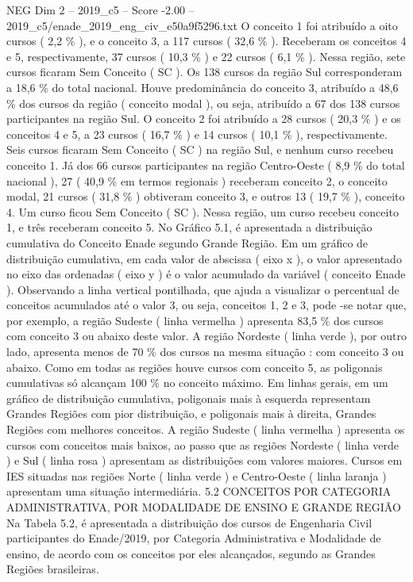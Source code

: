 \begin{textsample}{NEG Dim 2 – 2019\_c5 – Score -2.00 – 2019\_c5/enade\_2019\_eng\_civ\_e50a9f5296.txt}
O conceito 1 foi atribuído a oito cursos ( 2,2 \% ), e o conceito 3, a 117 cursos ( 32,6 \% ).
Receberam os conceitos 4 e 5, respectivamente, 37 cursos ( 10,3 \% ) e 22 cursos ( 6,1 \% ).
Nessa região, sete cursos ficaram Sem Conceito ( SC ).
Os 138 cursos da região Sul corresponderam a 18,6 \% do total nacional.
Houve predominância do conceito 3, atribuído a 48,6 \% dos cursos da região ( conceito modal ), ou seja, atribuído a 67 dos 138 cursos participantes na região Sul.
O conceito 2 foi atribuído a 28 cursos ( 20,3 \% ) e os conceitos 4 e 5, a 23 cursos ( 16,7 \% ) e 14 cursos ( 10,1 \% ), respectivamente.
Seis cursos ficaram Sem Conceito ( SC ) na região Sul, e nenhum curso recebeu conceito 1.
Já dos 66 cursos participantes na região Centro-Oeste ( 8,9 \% do total nacional ), 27 ( 40,9 \% em termos regionais ) receberam conceito 2, o conceito modal, 21 cursos ( 31,8 \% ) obtiveram conceito 3, e outros 13 ( 19,7 \% ), conceito 4.
Um curso ficou Sem Conceito ( SC ).
Nessa região, um curso recebeu conceito 1, e três receberam conceito 5.
No Gráfico 5.1, é apresentada a distribuição cumulativa do Conceito Enade segundo Grande Região.
Em um gráfico de distribuição cumulativa, em cada valor de abscissa ( eixo x ), o valor apresentado no eixo das ordenadas ( eixo y ) é o valor acumulado da variável ( conceito Enade ).
Observando a linha vertical pontilhada, que ajuda a visualizar o percentual de conceitos acumulados até o valor 3, ou seja, conceitos 1, 2 e 3, pode -se notar que, por exemplo, a região Sudeste ( linha vermelha ) apresenta 83,5 \% dos cursos com conceito 3 ou abaixo deste valor.
A região Nordeste ( linha verde ), por outro lado, apresenta menos de 70 \% dos cursos na mesma situação : com conceito 3 ou abaixo.
Como em todas as regiões houve cursos com conceito 5, as poligonais cumulativas só alcançam 100 \% no conceito máximo.
Em linhas gerais, em um gráfico de distribuição cumulativa, poligonais mais à esquerda representam Grandes Regiões com pior distribuição, e poligonais mais à direita, Grandes Regiões com melhores conceitos.
A região Sudeste ( linha vermelha ) apresenta os cursos com conceitos mais baixos, ao passo que as regiões Nordeste ( linha verde ) e Sul ( linha rosa ) apresentam as distribuições com valores maiores.
Cursos em IES situadas nas regiões Norte ( linha verde ) e Centro-Oeste ( linha laranja ) apresentam uma situação intermediária. 5.2 CONCEITOS POR CATEGORIA ADMINISTRATIVA, POR MODALIDADE DE ENSINO E GRANDE REGIÃO Na Tabela 5.2, é apresentada a distribuição dos cursos de Engenharia Civil participantes do Enade/2019, por Categoria Administrativa e Modalidade de ensino, de acordo com os conceitos por eles alcançados, segundo as Grandes Regiões brasileiras.

\end{textsample}
